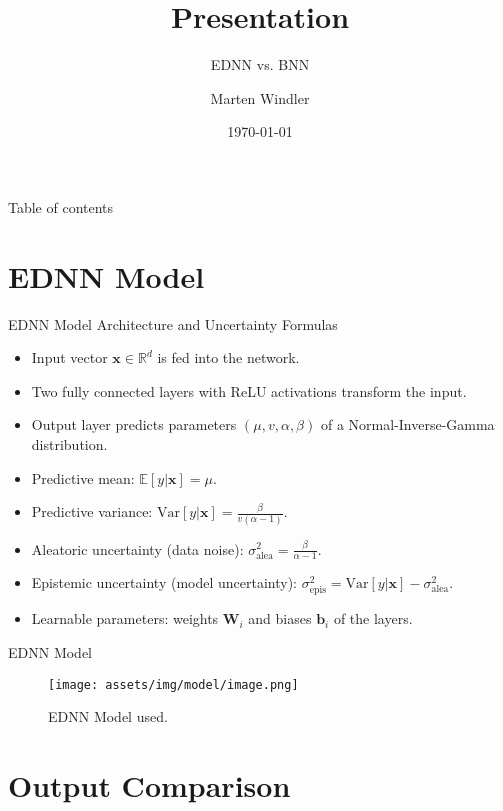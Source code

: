 \documentclass[10pt]{beamer}
\title{Presentation}
\subtitle{EDNN vs. BNN}
\date{\today}
\author{Marten Windler}
\institute{Atlas Elektronik, A-Lab}
\begin{document}
\maketitle

\begin{frame}{Table of contents}
  \tableofcontents[hideallsubsections]
\end{frame}

\section{EDNN Model}

\begin{frame}{EDNN Model Architecture and Uncertainty Formulas}
  \begin{itemize}
    \item Input vector $\mathbf{x} \in \mathbb{R}^d$ is fed into the network.
    \item Two fully connected layers with ReLU activations transform the input.
    \item Output layer predicts parameters $(\mu, v, \alpha, \beta)$ of a Normal-Inverse-Gamma distribution.
    \item Predictive mean: $\mathbb{E}[y|\mathbf{x}] = \mu$.
    \item Predictive variance: $\mathrm{Var}[y|\mathbf{x}] = \frac{\beta}{v(\alpha - 1)}$.
    \item Aleatoric uncertainty (data noise): $\sigma^2_{\text{alea}} = \frac{\beta}{\alpha - 1}$.
    \item Epistemic uncertainty (model uncertainty): $\sigma^2_{\text{epis}} = \mathrm{Var}[y|\mathbf{x}] - \sigma^2_{\text{alea}}$.
    \item Learnable parameters: weights $\mathbf{W}_i$ and biases $\mathbf{b}_i$ of the layers.
  \end{itemize}
\end{frame}


\begin{frame}{EDNN Model}
  \begin{figure}
    \centering
    \texttt{[image: assets/img/model/image.png]}
    \caption{EDNN Model used.}
  \end{figure}
\end{frame}

\section{Output Comparison}
\end{document}

